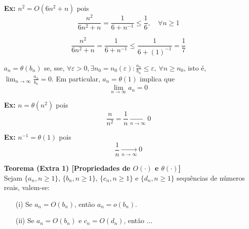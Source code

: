 \textbf{Ex:} $n^2 = O(6n^2 + n)$ pois
\begin{equation}
\frac{n^2}{6n^2 + n} = \frac{1}{6 + n^{-1}} \leq \frac{1}{6}, \quad \forall n \geq 1
\end{equation}

\[
\frac{n^2}{6n^2 + n} = \frac{1}{6 + n^{-1}} \leq \frac{1}{6 + (1)^{-1}} = \frac{1}{7}
\]

$a_n = \theta(b_n)$ se, sse, $\forall \varepsilon > 0, \exists n_0 = n_0(\varepsilon): \frac{a_n}{b_n} \leq \varepsilon, \ \forall n \geq n_0$, isto é, $\lim_{n \to \infty} \frac{a_n}{b_n} = 0$. Em particular, $a_n = \theta(1)$ implica que
\begin{equation}
\lim_{n \to \infty} a_n = 0
\end{equation}

\textbf{Ex:} $n = \theta(n^2)$ pois
\begin{equation}
\frac{n}{n^2} = \frac{1}{n} \xrightarrow[n \to \infty]{} 0
\end{equation}

\textbf{Ex:} $n^{-1} = \theta(1)$ pois
\begin{equation}
\frac{1}{n} \xrightarrow[n \to \infty]{} 0
\end{equation}

\textbf{Teorema (Extra 1) [Propriedades de $O(\cdot)$ e $\theta(\cdot)$]} \\
Sejam $\{a_n, n \geq 1\}$, $\{b_n, n \geq 1\}$, $\{c_n, n \geq 1\}$ e $\{d_n, n \geq 1\}$ sequências de números reais, valem-se:

\begin{itemize}
    \item[(i)] Se $a_n = O(b_n)$, então $a_n = o(b_n)$.
    \item[(ii)] Se $a_n = O(b_n)$ e $c_n = O(d_n)$, então ...
\end{itemize}